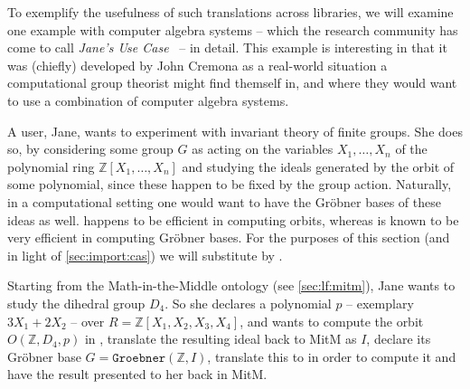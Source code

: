 To exemplify the usefulness of such translations across libraries, we will examine one example with computer algebra systems -- which the \ODK research community has come to call \emph{Jane's Use Case}~\cite{ODK:interop:17} -- in detail. This example is interesting in that it was (chiefly) developed by John Cremona as a real-world situation a computational group theorist might find themself in, and where they would want to use a combination of computer algebra systems.

A user, Jane, wants to experiment with invariant theory of finite groups. She does so, by considering some group $G$ as acting on the variables $X_1,\ldots, X_n$ of the polynomial ring $\mathbb Z[X_1,\ldots,X_n]$ and studying the ideals generated by the orbit of some polynomial, since these happen to be fixed by the group action. Naturally, in a computational setting one would want to have the Gröbner bases of these ideas as well. \GAP happens to be efficient in computing orbits, whereas \Singular is known to be very efficient in computing Gröbner bases. For the purposes of this section (and in light of \autoref{sec:import:cas}) we will substitute \Singular by \Sage.

Starting from the Math-in-the-Middle ontology (see \autoref{sec:lf:mitm}), Jane wants to study the dihedral group $D_4$. So she declares a polynomial $p$ -- exemplary $3X_1+2X_2$ -- over $R=\mathbb{Z}[X_1,X_2,X_3,X_4]$, and wants to compute the orbit $O(\mathbb Z,D_4,p)$ in \GAP, translate the resulting ideal back to MitM as $I$, declare its Gröbner base $G=\mathtt{Groebner}(\mathbb Z,I)$, translate this to \Sage in order to compute it and have the result presented to her back in MitM.\medskip

